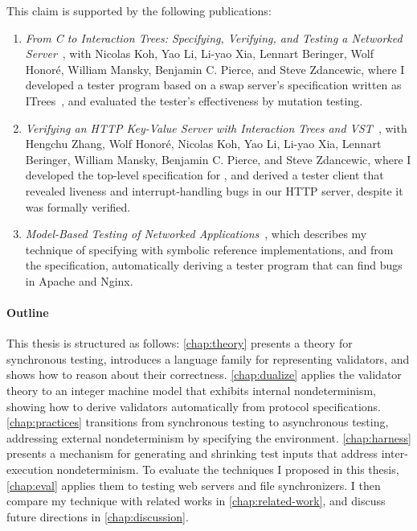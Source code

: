 This claim is supported by the following publications:
\begin{enumerate}
\item {\it From C to Interaction Trees: Specifying, Verifying, and Testing a
  Networked Server}~\citep{cpp19}, with Nicolas Koh, Yao Li, Li-yao Xia, Lennart
  Beringer, Wolf Honor\'e, William Mansky, Benjamin C. Pierce, and Steve
  Zdancewic, where I developed a tester program based on a swap server's
  specification written as ITrees~\citep{itree}, and evaluated the tester's
  effectiveness by mutation testing.
\item {\it Verifying an HTTP Key-Value Server with Interaction Trees and
  VST}~\citep{itp21}, with Hengchu Zhang, Wolf Honor\'e, Nicolas Koh, Yao Li,
  Li-yao Xia, Lennart Beringer, William Mansky, Benjamin C. Pierce, and Steve
  Zdancewic, where I developed the top-level specification for \http, and
  derived a tester client that revealed liveness and interrupt-handling bugs in
  our HTTP server, despite it was formally verified.
\item {\it Model-Based Testing of Networked Applications}~\citep{issta21}, which
  describes my technique of specifying \http with symbolic reference
  implementations, and from the specification, automatically deriving a tester
  program that can find bugs in Apache and Nginx.
\end{enumerate}

\paragraph{Outline}
This thesis is structured as follows: \autoref{chap:theory} presents a theory
for synchronous testing, introduces a language family for representing
validators, and shows how to reason about their correctness.
\autoref{chap:dualize} applies the validator theory to an integer machine model
that exhibits internal nondeterminism, showing how to derive validators
automatically from protocol specifications.
\autoref{chap:practices} transitions from synchronous testing to asynchronous
testing, addressing external nondeterminism by specifying the environment.
\autoref{chap:harness} presents a mechanism for generating and shrinking test
inputs that address inter-execution nondeterminism.  To evaluate the techniques
I proposed in this thesis, \autoref{chap:eval} applies them to testing web
servers and file synchronizers.  I then compare my technique with related works
in \autoref{chap:related-work}, and discuss future directions in
\autoref{chap:discussion}.

